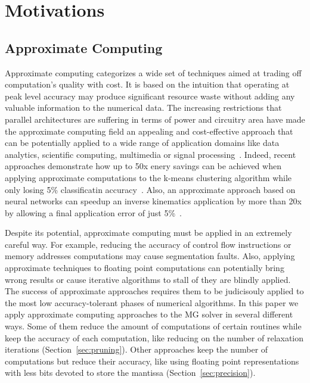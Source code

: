 \section{Motivations}
\label{sec:motivation}


\subsection{Approximate Computing}
\label{sec:approx}


Approximate computing categorizes a wide set of techniques aimed at trading off computation's quality with cost.
It is based on the intuition that operating at peak level accuracy may produce significant resource waste without adding any valuable information to the numerical data.
The increasing restrictions that parallel architectures are suffering in terms of power and circuitry area have made the approximate computing field an appealing and cost-effective approach that can be potentially applied to a wide range of application domains like data analytics, scientific computing, multimedia or signal
processing~\cite{Mittal2016}.
Indeed, recent approaches demonstrate how up to 50x enery savings can be achieved when applying approximate computations to the k-means clustering algorithm while only losing 5\% classificatin accuracy~\cite{Chippa2013}.
Also, an approximate approach based on neural networks can speedup an inverse kinematics application by more than 20x by allowing a final application error of just 5\%~\cite{Grigorian2015}.

Despite its potential, approximate computing must be applied in an extremely careful way.
For example, reducing the accuracy of control flow instructions or memory addresses computations may cause segmentation faults.
Also, applying approximate techniques to floating point computations can potentially bring wrong results or cause iterative algorithms to stall of they are blindly applied.
The success of approximate approaches requires them to be judicisouly applied to the most low accuracy-tolerant phases of numerical algorithms.
In this paper we apply approximate computing approaches to the MG solver in several different ways.
Some of them reduce the amount of computations of certain routines while keep the accuracy of each computation, like reducing on the number of relaxation iterations (Section~\ref{sec:pruning}).
Other approaches keep the number of computations but reduce their accuracy, like using floating point representations with less bits devoted to store the mantissa (Section~\ref{sec:precision}).

